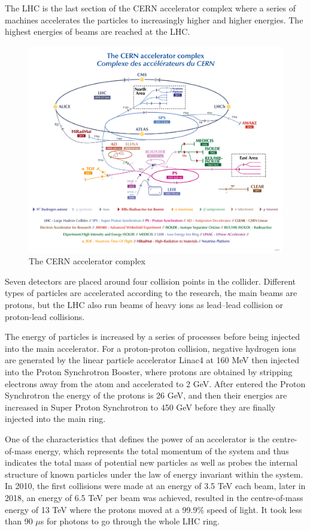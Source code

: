 \documentclass[UTF8,12pt]{ctexart}
\numberwithin{equation}{section}
\begin{document}
The LHC is the last section of the CERN accelerator complex where a series of machines accelerates the particles to increasingly higher and higher energies. The highest energies of beams are reached at the LHC.


 \begin{figure}[htb] 
 	\centering  
 		\includegraphics[width=14cm]{./fig/2022.png}
 		\caption{The CERN accelerator complex}
\end{figure}
 

 Seven detectors are placed around four collision points in the collider. Different types of particles are accelerated according to the research, the main beams are protons, but the LHC also run beams of heavy ions as lead–lead collision or proton-lead collisions.
 
 The energy of particles is increased by a series of processes before being injected into the main accelerator. For a proton-proton collision, negative hydrogen ions are generated by the linear particle accelerator Linac4 at 160 MeV then injected into the Proton Synchrotron Booster, where protons are obtained by stripping electrons away from the atom and accelerated to 2 GeV. After entered the Proton Synchrotron the energy of the protons is 26 GeV, and then their energies are increased in Super Proton Synchrotron to 450 GeV before they are finally injected into the main ring. 

  
One of the characteristics that defines the power of an accelerator is the centre-of-mass energy, which represents the total momentum of the system and thus indicates the total mass of potential new particles as well as probes the internal structure of known particles under the law of energy invariant within the system. In 2010, the first collisions were made at an energy of 3.5 TeV each beam, later in 2018, an energy of 6.5 TeV per beam was achieved, resulted in the centre-of-mass energy of 13 TeV where the protons moved at a 99.9\% speed of light. It took less than 90 $\mu$s for photons to go through the whole LHC ring. 
\end{document}
